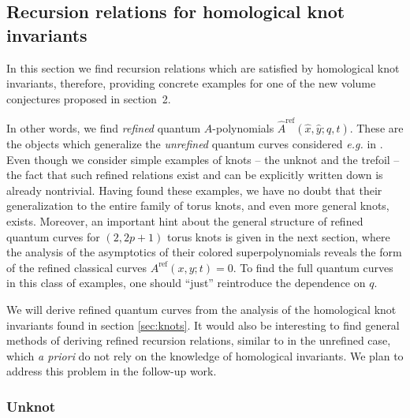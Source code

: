 \documentclass[hyper,letterpaper]{JHEP3}
\renewcommand{\hat}{\widehat}
\begin{document}

\subsection{Recursion relations for homological knot invariants}
\label{sec:knotrecursions}

In this section we find recursion relations which are satisfied by homological knot invariants,
therefore, providing concrete examples for one of the new volume conjectures proposed in section~2.

In other words, we find \emph{refined} quantum $A$-polynomials $\widehat{A}^{\textrm{ref}}(\hat x, \hat y;q,t)$.
These are the objects which generalize the \emph{unrefined} quantum curves considered {\it e.g.} in \cite{Apol,DHS,DGLZ,Tudor,abmodel}.
Even though we consider simple examples of knots -- the unknot and the trefoil -- the fact
that such refined relations exist and can be explicitly written down is already nontrivial.
Having found these examples, we have no doubt that their generalization to the entire family of torus knots, and even more general knots, exists. Moreover, an important hint about the general structure of refined quantum curves for $(2,2p+1)$ torus knots is given in the next section, where the analysis of the asymptotics of their colored superpolynomials reveals the form of the refined classical curves $A^{\textrm{ref}}(x,y;t)=0$.
To find the full quantum curves in this class of examples, one should ``just'' reintroduce the dependence on $q$.

We will derive refined quantum curves from the analysis of the homological knot invariants found in section \ref{sec:knots}.
It would also be interesting to find general methods of deriving refined recursion relations, similar to \cite{Tudor,abmodel}
in the unrefined case, which \emph{a priori} do not rely on the knowledge of homological invariants.
We plan to address this problem in the follow-up work.

\subsubsection{Unknot}
\end{document}
